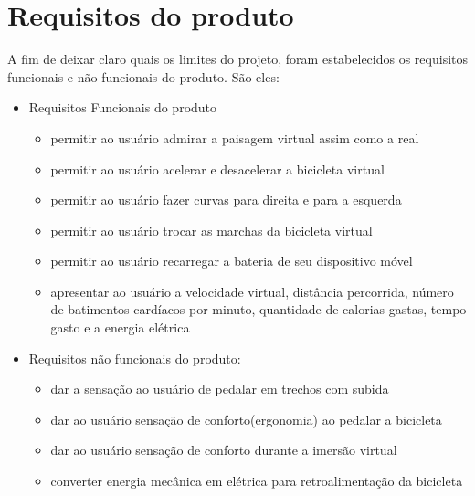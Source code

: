 \chapter[Requisitos do produto]{Requisitos do produto}

A fim de deixar claro quais os limites do projeto, foram estabelecidos os requisitos funcionais e não funcionais do produto. São eles:
\begin{itemize}
	\item Requisitos Funcionais do produto
		\begin{itemize}
		\item permitir ao usuário admirar a paisagem virtual assim como a real
		\item permitir ao usuário acelerar e desacelerar a bicicleta virtual
		\item permitir ao usuário fazer curvas para direita e para a esquerda
		\item permitir ao usuário trocar as marchas da bicicleta virtual
		\item permitir ao usuário recarregar a bateria de seu dispositivo móvel
		\item apresentar ao usuário a velocidade virtual, distância percorrida, número de batimentos cardíacos por minuto, quantidade de calorias gastas, tempo gasto e a energia elétrica
		\end{itemize}
	\item Requisitos não funcionais do produto:
		\begin{itemize}
		\item dar a sensação ao usuário de pedalar em trechos com subida
		\item dar ao usuário sensação de conforto(ergonomia) ao pedalar a bicicleta
		\item dar ao usuário sensação de conforto durante a imersão virtual
		\item converter energia mecânica em elétrica para retroalimentação da bicicleta
		\end{itemize}
\end{itemize}